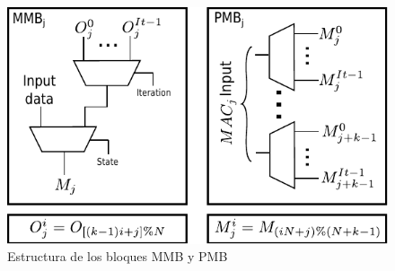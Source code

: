 \documentclass[a4paper]{article}
\begin{document}
\bigskip
\bigskip
\begin{figure}[H]
\centering
\includegraphics{muxes_cont}
\caption{ Estructura de los bloques MMB y PMB}
\label{mmu_structure}
\end{figure}




























\end{document}
